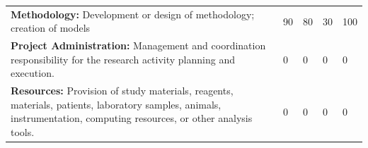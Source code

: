 \documentclass[a4paper,twoside=true,openright,parskip=full,chapterprefix=true,11pt,headings=normal,bibliography=totoc,listof=totoc,titlepage=on,captions=tableabove,draft=false]{scrreprt}
\theoremstyle{definition}
\theoremstyle{definition}
\theoremstyle{definition}
\theoremstyle{remark}
\begin{document}
\begin{longtable}[]{@{}lllll@{}}
\begin{minipage}[t]{0.49\columnwidth}
\textbf{Methodology:} Development or design of methodology; creation of
models\strut
\end{minipage} & \begin{minipage}[t]{0.11\columnwidth}\raggedright
90\strut
\end{minipage} & \begin{minipage}[t]{0.09\columnwidth}\raggedright
80\strut
\end{minipage} & \begin{minipage}[t]{0.10\columnwidth}\raggedright
30\strut
\end{minipage} & \begin{minipage}[t]{0.07\columnwidth}\raggedright
100\strut
\end{minipage}\tabularnewline
\begin{minipage}[t]{0.49\columnwidth}\raggedright
\textbf{Project Administration:} Management and coordination
responsibility for the research activity planning and execution.\strut
\end{minipage} & \begin{minipage}[t]{0.11\columnwidth}\raggedright
0\strut
\end{minipage} & \begin{minipage}[t]{0.09\columnwidth}\raggedright
0\strut
\end{minipage} & \begin{minipage}[t]{0.10\columnwidth}\raggedright
0\strut
\end{minipage} & \begin{minipage}[t]{0.07\columnwidth}\raggedright
0\strut
\end{minipage}\tabularnewline
\begin{minipage}[t]{0.49\columnwidth}\raggedright
\textbf{Resources:} Provision of study materials, reagents, materials,
patients, laboratory samples, animals, instrumentation, computing
resources, or other analysis tools.\strut
\end{minipage} & \begin{minipage}[t]{0.11\columnwidth}\raggedright
0\strut
\end{minipage} & \begin{minipage}[t]{0.09\columnwidth}\raggedright
0\strut
\end{minipage} & \begin{minipage}[t]{0.10\columnwidth}\raggedright
0\strut
\end{minipage} & \begin{minipage}[t]{0.07\columnwidth}\raggedright
0\strut
\end{minipage}\tabularnewline

\end{longtable}
\end{document}
